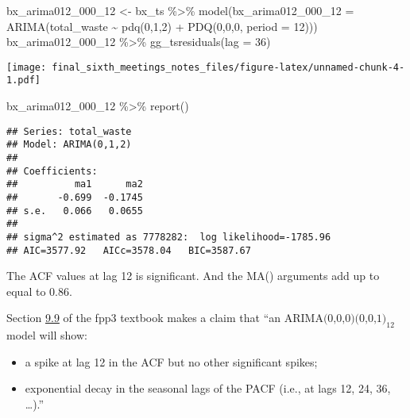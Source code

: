 \documentclass[
]{article}
\newenvironment{Shaded}{\begin{snugshade}}{\end{snugshade}}
\newcommand{\AttributeTok}[1]{\textcolor[rgb]{0.77,0.63,0.00}{#1}}
\newcommand{\DecValTok}[1]{\textcolor[rgb]{0.00,0.00,0.81}{#1}}
\newcommand{\FunctionTok}[1]{\textcolor[rgb]{0.00,0.00,0.00}{#1}}
\newcommand{\NormalTok}[1]{#1}
\newcommand{\OtherTok}[1]{\textcolor[rgb]{0.56,0.35,0.01}{#1}}
\newcommand{\SpecialCharTok}[1]{\textcolor[rgb]{0.00,0.00,0.00}{#1}}
\providecommand{\tightlist}{%
  \setlength{\itemsep}{0pt}\setlength{\parskip}{0pt}}
\begin{document}
\begin{Shaded}
\begin{Highlighting}[]
\NormalTok{bx\_arima012\_000\_12 }\OtherTok{\textless{}{-}}\NormalTok{ bx\_ts }\SpecialCharTok{\%\textgreater{}\%} \FunctionTok{model}\NormalTok{(}\AttributeTok{bx\_arima012\_000\_12 =} \FunctionTok{ARIMA}\NormalTok{(total\_waste }\SpecialCharTok{\textasciitilde{}} \FunctionTok{pdq}\NormalTok{(}\DecValTok{0}\NormalTok{,}\DecValTok{1}\NormalTok{,}\DecValTok{2}\NormalTok{) }\SpecialCharTok{+} \FunctionTok{PDQ}\NormalTok{(}\DecValTok{0}\NormalTok{,}\DecValTok{0}\NormalTok{,}\DecValTok{0}\NormalTok{, }\AttributeTok{period =} \DecValTok{12}\NormalTok{)))}
\NormalTok{bx\_arima012\_000\_12 }\SpecialCharTok{\%\textgreater{}\%} \FunctionTok{gg\_tsresiduals}\NormalTok{(}\AttributeTok{lag =} \DecValTok{36}\NormalTok{)}
\end{Highlighting}
\end{Shaded}

\texttt{[image: final\_sixth\_meetings\_notes\_files/figure-latex/unnamed-chunk-4-1.pdf]}

\begin{Shaded}
\begin{Highlighting}[]
\NormalTok{bx\_arima012\_000\_12 }\SpecialCharTok{\%\textgreater{}\%} \FunctionTok{report}\NormalTok{()}
\end{Highlighting}
\end{Shaded}

\begin{verbatim}
## Series: total_waste 
## Model: ARIMA(0,1,2) 
## 
## Coefficients:
##          ma1      ma2
##       -0.699  -0.1745
## s.e.   0.066   0.0655
## 
## sigma^2 estimated as 7778282:  log likelihood=-1785.96
## AIC=3577.92   AICc=3578.04   BIC=3587.67
\end{verbatim}

The ACF values at lag 12 is significant. And the MA() arguments add up
to equal to 0.86.

Section \href{https://otexts.com/fpp3/seasonal-arima.html}{9.9} of the
fpp3 textbook makes a claim that ``an
\(\text{ARIMA(0,0,0)(0,0,1)}_{12}\) model will show:

\begin{itemize}
\tightlist
\item
  a spike at lag 12 in the ACF but no other significant spikes;
\item
  exponential decay in the seasonal lags of the PACF (i.e., at lags 12,
  24, 36, \ldots).''
\end{itemize}
\end{document}
